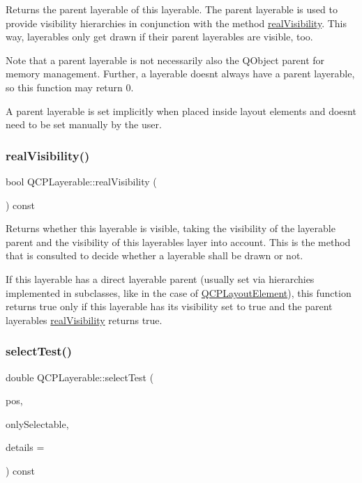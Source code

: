 Returns the parent layerable of this layerable. The parent layerable is used to provide visibility hierarchies in conjunction with the method \mbox{\hyperlink{class_q_c_p_layerable_ab054e88f15d485defcb95e7376f119e7}{real\+Visibility}}. This way, layerables only get drawn if their parent layerables are visible, too.

Note that a parent layerable is not necessarily also the Q\+Object parent for memory management. Further, a layerable doesn\textquotesingle{}t always have a parent layerable, so this function may return 0.

A parent layerable is set implicitly when placed inside layout elements and doesn\textquotesingle{}t need to be set manually by the user. \mbox{\label{class_q_c_p_layerable_ab054e88f15d485defcb95e7376f119e7}} 
\subsubsection{\texorpdfstring{real\+Visibility()}{realVisibility()}}
{\footnotesize\ttfamily bool Q\+C\+P\+Layerable\+::real\+Visibility (\begin{DoxyParamCaption}{ }\end{DoxyParamCaption}) const}

Returns whether this layerable is visible, taking the visibility of the layerable parent and the visibility of this layerable\textquotesingle{}s layer into account. This is the method that is consulted to decide whether a layerable shall be drawn or not.

If this layerable has a direct layerable parent (usually set via hierarchies implemented in subclasses, like in the case of \mbox{\hyperlink{class_q_c_p_layout_element}{Q\+C\+P\+Layout\+Element}}), this function returns true only if this layerable has its visibility set to true and the parent layerable\textquotesingle{}s \mbox{\hyperlink{class_q_c_p_layerable_ab054e88f15d485defcb95e7376f119e7}{real\+Visibility}} returns true. \mbox{\label{class_q_c_p_layerable_a04db8351fefd44cfdb77958e75c6288e}} 
\subsubsection{\texorpdfstring{select\+Test()}{selectTest()}}
{\footnotesize\ttfamily double Q\+C\+P\+Layerable\+::select\+Test (\begin{DoxyParamCaption}\item[{const Q\+PointF \&}]{pos,  }\item[{bool}]{only\+Selectable,  }\item[{Q\+Variant $\ast$}]{details = {} }\end{DoxyParamCaption}) const\hspace{0.3cm}{\ttfamily [virtual]}}

